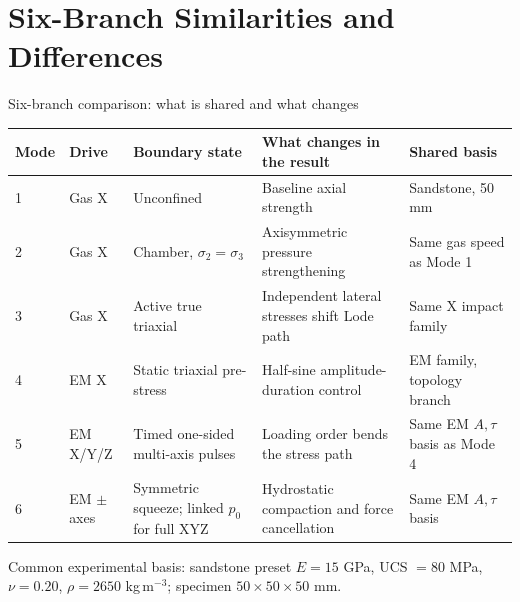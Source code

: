 \documentclass[11pt,aspectratio=169]{beamer}
\newcommand{\toprule}{\hline}
\newcommand{\midrule}{\hline}
\newcommand{\bottomrule}{\hline}
\newcommand{\cncue}[1]{{\footnotesize\color{TUSTmidgray} #1}}
\begin{document}
\section{Six-Branch Similarities and Differences}

\begin{frame}{Six-branch comparison: what is shared and what changes}
  \tiny
  \begin{tabular}{@{}p{}p{}p{}p{}p{}@{}}
    \toprule
    \textbf{Mode} & \textbf{Drive} & \textbf{Boundary state} & \textbf{What changes in the result} & \textbf{Shared basis} \\
    \midrule
    1 & Gas X & Unconfined & Baseline axial strength & Sandstone, 50 mm \\
    2 & Gas X & Chamber, $\sigma_2=\sigma_3$ & Axisymmetric pressure strengthening & Same gas speed as Mode 1 \\
    3 & Gas X & Active true triaxial & Independent lateral stresses shift Lode path & Same X impact family \\
    4 & EM X & Static triaxial pre-stress & Half-sine amplitude-duration control & EM family, topology branch \\
    5 & EM X/Y/Z & Timed one-sided multi-axis pulses & Loading order bends the stress path & Same EM $A,\tau$ basis as Mode 4 \\
    6 & EM $\pm$ axes & Symmetric squeeze; linked $p_0$ for full XYZ & Hydrostatic compaction and force cancellation & Same EM $A,\tau$ basis \\
    \bottomrule
  \end{tabular}
  \vspace{0.16cm}
  \cncue{Common experimental basis: sandstone preset
  $E=15$ GPa, UCS $=80$ MPa, $\nu=0.20$, $\rho=2650$ kg\,m$^{-3}$;
  specimen $50\times50\times50$ mm.}
\end{frame}
\end{document}
